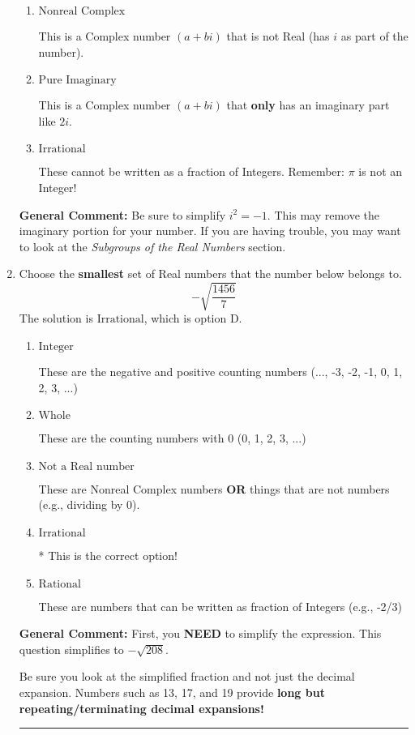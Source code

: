 \documentclass{extbook}[14pt]
\newcommand{\litem}[1]{\item #1

\rule{\textwidth}{0.4pt}}
\begin{document}
\begin{enumerate}
{\begin{enumerate}[label=\Alph*.]
This is not a number. The only non-Complex number we know is dividing by 0 as this is not a number!
\item \( \text{Nonreal Complex} \)

This is a Complex number $(a+bi)$ that is not Real (has $i$ as part of the number).
\item \( \text{Pure Imaginary} \)

This is a Complex number $(a+bi)$ that \textbf{only} has an imaginary part like $2i$.
\item \( \text{Irrational} \)

These cannot be written as a fraction of Integers. Remember: $\pi$ is not an Integer!
\end{enumerate}

\textbf{General Comment:} Be sure to simplify $i^2 = -1$. This may remove the imaginary portion for your number. If you are having trouble, you may want to look at the \textit{Subgroups of the Real Numbers} section.
}
\litem{
Choose the \textbf{smallest} set of Real numbers that the number below belongs to.
\[ -\sqrt{\frac{1456}{7}} \]The solution is \( \text{Irrational} \), which is option D.\begin{enumerate}[label=\Alph*.]
\item \( \text{Integer} \)

These are the negative and positive counting numbers (..., -3, -2, -1, 0, 1, 2, 3, ...)
\item \( \text{Whole} \)

These are the counting numbers with 0 (0, 1, 2, 3, ...)
\item \( \text{Not a Real number} \)

These are Nonreal Complex numbers \textbf{OR} things that are not numbers (e.g., dividing by 0).
\item \( \text{Irrational} \)

* This is the correct option!
\item \( \text{Rational} \)

These are numbers that can be written as fraction of Integers (e.g., -2/3)
\end{enumerate}

\textbf{General Comment:} First, you \textbf{NEED} to simplify the expression. This question simplifies to $-\sqrt{208}$. 
 
 Be sure you look at the simplified fraction and not just the decimal expansion. Numbers such as 13, 17, and 19 provide \textbf{long but repeating/terminating decimal expansions!} 
 
}
\end{enumerate}
\end{document}
